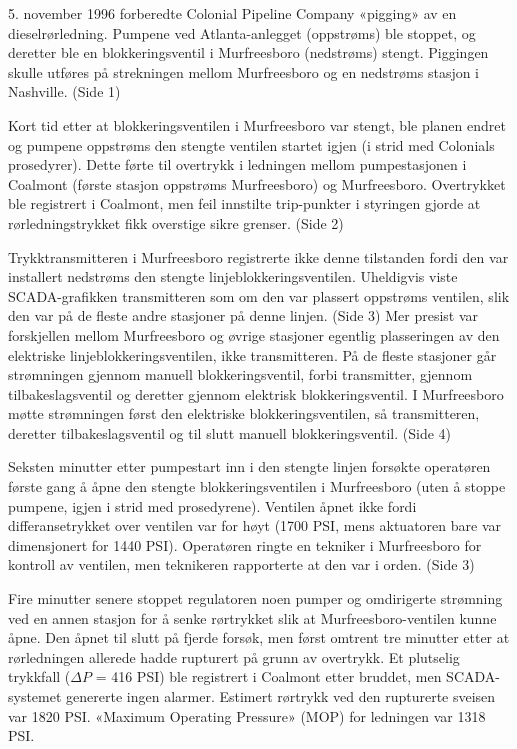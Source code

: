 





5. november 1996 forberedte Colonial Pipeline Company «pigging» av en dieselrørledning. Pumpene ved Atlanta-anlegget (oppstrøms) ble stoppet, og deretter ble en blokkeringsventil i Murfreesboro (nedstrøms) stengt. Piggingen skulle utføres på strekningen mellom Murfreesboro og en nedstrøms stasjon i Nashville. (Side 1)

\vskip 10pt

Kort tid etter at blokkeringsventilen i Murfreesboro var stengt, ble planen endret og pumpene oppstrøms den stengte ventilen startet igjen (i strid med Colonials prosedyrer). Dette førte til overtrykk i ledningen mellom pumpestasjonen i Coalmont (første stasjon oppstrøms Murfreesboro) og Murfreesboro. Overtrykket ble registrert i Coalmont, men feil innstilte trip-punkter i styringen gjorde at rørledningstrykket fikk overstige sikre grenser. (Side 2)

Trykktransmitteren i Murfreesboro registrerte ikke denne tilstanden fordi den var installert nedstrøms den stengte linjeblokkeringsventilen. Uheldigvis viste SCADA-grafikken transmitteren som om den var plassert oppstrøms ventilen, slik den var på de fleste andre stasjoner på denne linjen. (Side 3) Mer presist var forskjellen mellom Murfreesboro og øvrige stasjoner egentlig plasseringen av den elektriske linjeblokkeringsventilen, ikke transmitteren. På de fleste stasjoner går strømningen gjennom manuell blokkeringsventil, forbi transmitter, gjennom tilbakeslagsventil og deretter gjennom elektrisk blokkeringsventil. I Murfreesboro møtte strømningen først den elektriske blokkeringsventilen, så transmitteren, deretter tilbakeslagsventil og til slutt manuell blokkeringsventil. (Side 4)

\vskip 10pt

Seksten minutter etter pumpestart inn i den stengte linjen forsøkte operatøren første gang å åpne den stengte blokkeringsventilen i Murfreesboro (uten å stoppe pumpene, igjen i strid med prosedyrene). Ventilen åpnet ikke fordi differansetrykket over ventilen var for høyt (1700 PSI, mens aktuatoren bare var dimensjonert for 1440 PSI). Operatøren ringte en tekniker i Murfreesboro for kontroll av ventilen, men teknikeren rapporterte at den var i orden. (Side 3)

\vskip 10pt

Fire minutter senere stoppet regulatoren noen pumper og omdirigerte strømning ved en annen stasjon for å senke rørtrykket slik at Murfreesboro-ventilen kunne åpne. Den åpnet til slutt på fjerde forsøk, men først omtrent tre minutter etter at rørledningen allerede hadde rupturert på grunn av overtrykk. Et plutselig trykkfall ($\Delta P$ = 416 PSI) ble registrert i Coalmont etter bruddet, men SCADA-systemet genererte ingen alarmer. Estimert rørtrykk ved den rupturerte sveisen var 1820 PSI. «Maximum Operating Pressure» (MOP) for ledningen var 1318 PSI.

